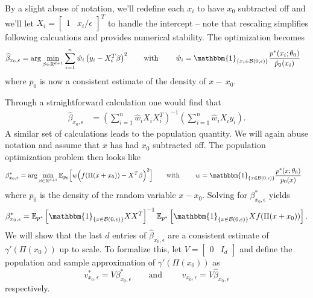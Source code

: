 \documentclass[11pt]{article}
\begin{document}
\noindent By a slight abuse of notation, we'll redefine each $x_i$ to have $x_0$ subtracted off and we'll let $X_i = \begin{bmatrix}
    1 & x_i/\epsilon
\end{bmatrix}^T$ to handle the intercept -- note that rescaling simplifies following calcuations and provides numerical stability. The optimization becomes 
\begin{align} 
\widehat{\beta}_{x_0,\epsilon} &= \arg\min_{\beta \in \mathbb{R}^{d+1}} \sum_{i = 1}^{n}\hat{w}_i\left(y_i - X_i^{T}\beta\right)^2 \qquad \text{with }\qquad \hat{w}_i = \mathbbm{1}_{\{x_i \in \mathcal{B}(0, \epsilon)\}}\frac{p^*(x_i;\theta_0)}{\hat{p}_0(x_i)}
\end{align}
where $\hat{p}_0$ is now a consistent estimate of the density of $x - \,x_0$. 

Through a straightforward calculation one would find that
\begin{align}
    \widehat{\beta}_{x_0,\epsilon} &= \left(\sum_{i = 1}^n\hat{w}_iX_iX_i^T\right)^{-1}\left(\sum_{i = 1}^n\hat{w}_iX_iy_i\right). \label{eq: sample est closed form}
\end{align}
A similar set of calculations leads to the population quantity. We will again abuse notation and assume that $x$ has had $x_0$ subtracted off. The population optimization problem then looks like
\begin{align}
\beta^*_{x_0, \epsilon} &= \arg\min_{\beta \in \mathbb{R}^{d+1}} \mathbb{E}_{p_0} \Big[w\Big(f(\Pi(x + x_0)) - X^{T}\beta \Big)^2\Big] \qquad \text{with }\qquad w = \mathbbm{1}_{\{x \in \mathcal{B}(0, \epsilon)\}}\frac{p^*(x;\theta_0)}{p_0(x)}\label{eq: population estimator}
\end{align}
where $p_0$ is the density of the random variable $x - x_0$. Solving for $\beta^*_{x_0, \epsilon}$ yields
\begin{align}
    \beta^*_{x_0, \epsilon} = \mathbb{E}_{p^*}\left[\mathbbm{1}_{\{x \in \mathcal{B}(0,\epsilon)\}}XX^T\right]^{-1}\mathbb{E}_{p^*}\left[\mathbbm{1}_{\{x \in \mathcal{B}(0,\epsilon)\}}Xf(\Pi(x+x_0))\right]. \label{eq: population estimator closed form}
\end{align}
We will show that the last $d$ entries of $\widehat{\beta}_{x_0,\epsilon}$ are a consistent estimate of $\gamma'(\Pi(x_0))$ up to scale. To formalize this, let $V = \begin{bmatrix} 0 & I_d\end{bmatrix}$ and define the population and sample approximation of $\gamma'(\Pi(x_0))$ as
\begin{equation}
    v^*_{x_0, \epsilon} = V\beta^*_{x_0, \epsilon} \qquad \text{and }\qquad \hat{v}_{x_0, \epsilon} = V\hat{\beta}_{x_0, \epsilon} \label{eq: velocity estimator}
\end{equation}
respectively.
\end{document}

